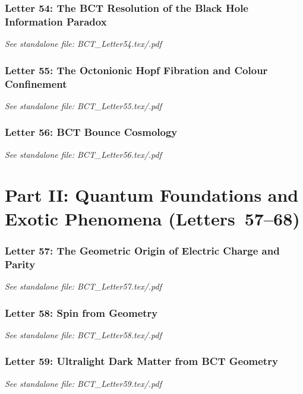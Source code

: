 \documentclass[aps,preprint,superscriptaddress,floatfix]{revtex4-2}
\begin{document}
\newpage
\section*{Letter 54: The BCT Resolution of the Black Hole Information Paradox}
\textit{See standalone file: BCT\_Letter54.tex/.pdf}

\newpage
\section*{Letter 55: The Octonionic Hopf Fibration and Colour Confinement}
\textit{See standalone file: BCT\_Letter55.tex/.pdf}

\newpage
\section*{Letter 56: BCT Bounce Cosmology}
\textit{See standalone file: BCT\_Letter56.tex/.pdf}

\newpage
\part*{Part II: Quantum Foundations and Exotic Phenomena (Letters~57--68)}

\newpage
\section*{Letter 57: The Geometric Origin of Electric Charge and Parity}
\textit{See standalone file: BCT\_Letter57.tex/.pdf}

\newpage
\section*{Letter 58: Spin from Geometry}
\textit{See standalone file: BCT\_Letter58.tex/.pdf}

\newpage
\section*{Letter 59: Ultralight Dark Matter from BCT Geometry}
\textit{See standalone file: BCT\_Letter59.tex/.pdf}
\end{document}
